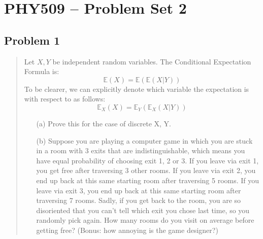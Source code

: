 \documentclass[10pt]{article}
\begin{document}
\section{PHY509 – Problem Set 2}

\subsection*{Problem 1}
\begin{quote}
	Let $X, Y$ be independent random variables. The Conditional Expectation Formula is:
	$$ \mathbb{E}(X)=\mathbb{E}(\mathbb{E}(X|Y)) $$
	To be clearer, we can explicitly denote which variable the expectation is with respect to as follows:
	$$ \mathbb{E}_{X}(X)=\mathbb{E}_{Y}(\mathbb{E}_{X}(X|Y)) $$
	\begin{enumerate}
		\item[(a)] Prove this for the case of discrete X, Y.
		\item[(b)] Suppose you are playing a computer game in which you are stuck in a room with 3 exits that are indistinguishable, which means you have equal probability of choosing exit 1, 2 or 3. If you leave via exit 1, you get free after traversing 3 other rooms. If you leave via exit 2, you end up back at this same starting room after traversing 5 rooms. If you leave via exit 3, you end up back at this same starting room after traversing 7 rooms. Sadly, if you get back to the room, you are so disoriented that you can't tell which exit you chose last time, so you randomly pick again. How many rooms do you visit on average before getting free? (Bonus: how annoying is the game designer?)
	\end{enumerate}
\end{quote}

\divider
\end{document}
